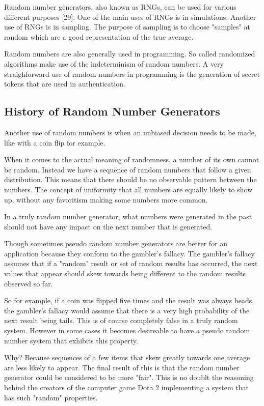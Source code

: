 \documentclass{article}
\begin{document}
    Random number generators, also known as RNGs, can be used for various different purposes [29].
    One of the main uses of RNGs is in simulations.
    Another use of RNGs is in sampling. The purpose of sampling is to choose
    "samples" at random which are a good representation of the true average.

    Random numbers are also generally used in programming. So called randomized algorithms
    make use of the indeterminism of random numbers.
    A very straighforward use of random numbers in programming
    is the generation of secret tokens that are used in authentication.
        
    \subsection{History of Random Number Generators}

    Another use of random numbers is when an unbiased decision needs to be made,
    like with a coin flip for example.

    When it comes to the actual meaning of randomness, a number of its own cannot be random.
    Instead we have a sequence of random numbers that follow a given distribution.
    This means that there should be no observable pattern between the numbers.
    The concept of uniformity that all numbers are equally likely to show up, without
    any favoritism making some numbers more common.
    
    In a truly random number generator, what numbers were generated in the past
    should not have any impact on the next number that is generated.

    Though sometimes pseudo random number generators are better for an application
    because they conform to the gambler's fallacy.
    The gambler's fallacy assumes that if a "random" result or set of random
    results has occurred, the next values that appear should skew towards being
    different to the random results observed so far.

    So for example, if a coin was flipped five times and the result was always heads,
    the gambler's fallacy would assume that there is a very high probability
    of the next result being tails. This is of course completely false in
    a truly random system.
    However in some cases it becomes desireable to have a pseudo random number system
    that exhibits this property.

    Why? Because sequences of a few items that skew greatly towards one average
    are less likely to appear.
    The final result of this is that the random number generator could be considered
    to be more "fair".
    This is no doublt the reasoning behind the creators of the computer game Dota 2
    implementing a system that has such "random" properties.
\end{document}
